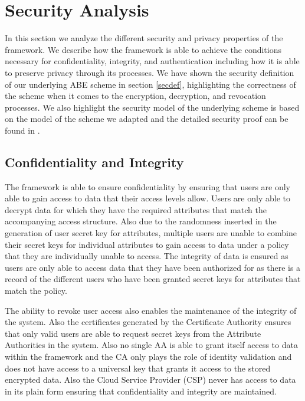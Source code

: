 \section{Security Analysis}

In this section we analyze the different security and privacy properties of the framework. We describe how the framework is able to achieve the conditions necessary for confidentiality, integrity, and authentication including how it is able to preserve privacy through its processes. We have shown the security definition of our underlying ABE scheme in section \ref{secdef}, highlighting the correctness of the scheme when it comes to the encryption, decryption, and revocation processes. We also highlight the security model of the underlying scheme is based on the model of the scheme we adapted and the detailed security proof can be found in \cite{Yang2014}.

\subsection*{Confidentiality and Integrity}

The framework is able to ensure confidentiality by ensuring that users are only able to gain access to data that their access levels allow. Users are only able to decrypt data for which they have the required attributes that match the accompanying access structure. Also due to the randomness inserted in the generation of user secret key for attributes, multiple users are unable to combine their secret keys for individual attributes to gain access to data under a policy that they are individually unable to access. The integrity of data is ensured as users are only able to access data that they have been authorized for as there is a record of the different users who have been granted secret keys for attributes that match the policy.

The ability to revoke user access also enables the maintenance of the integrity of the system. Also the certificates generated by the Certificate Authority ensures that only valid users are able to request secret keys from the Attribute Authorities in the system. Also no single AA is able to grant itself access to data within the framework and the CA only plays the role of identity validation and does not have access to a universal key that grants it access to the stored encrypted data. Also the Cloud Service Provider (CSP) never has access to data in its plain form ensuring that confidentiality and integrity are maintained.

